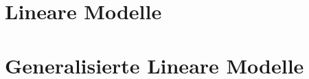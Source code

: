 \documentclass[handout,aspectratio=1610,dvipsnames]{beamer}
\begin{document}
  \section{Lineare Modelle}
  \let\woopsi\section\let\section\subsection\let\subsection\subsubsection
  
  \let\subsection\section\let\section\woopsi

  \section{Generalisierte Lineare Modelle}
  \let\woopsi\section\let\section\subsection\let\subsection\subsubsection
  
  \let\subsection\section\let\section\woopsi
\end{document}
